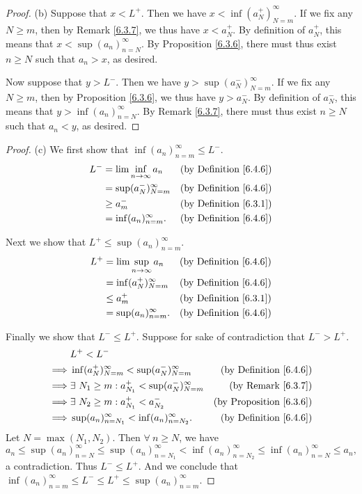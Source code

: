 \begin{proof}{(b)}
Suppose that \(x < L^+\).
Then we have \(x < \inf(a_N^+)_{N = m}^\infty\).
If we fix any \(N \geq m\), then by Remark \ref{6.3.7}, we thus have \(x < a_N^+\).
By definition of \(a_N^+\), this means that \(x < \sup(a_n)_{n = N}^\infty\).
By Proposition \ref{6.3.6}, there must thus exist \(n \geq N\) such that \(a_n > x\), as desired.

Now suppose that \(y > L^-\).
Then we have \(y > \sup(a_N^-)_{N = m}^\infty\).
If we fix any \(N \geq m\), then by Proposition \ref{6.3.6}, we thus have \(y > a_N^-\).
By definition of \(a_N^-\), this means that \(y > \inf(a_n)_{n = N}^\infty\).
By Remark \ref{6.3.7}, there must thus exist \(n \geq N\) such that \(a_n < y\), as desired.
\end{proof}

\begin{proof}{(c)}
We first show that \(\inf(a_n)_{n = m}^\infty \leq L^-\).
\begin{align*}
L^- &= \lim\inf_{n \to \infty} a_n & \text{(by Definition \ref{6.4.6})} \\
&= \sup(a_N^-)_{N = m}^\infty & \text{(by Definition \ref{6.4.6})} \\
&\geq a_m^- & \text{(by Definition \ref{6.3.1})} \\
&= \inf(a_n)_{n = m}^\infty. & \text{(by Definition \ref{6.4.6})}
\end{align*}

Next we show that \(L^+ \leq \sup(a_n)_{n = m}^\infty\).
\begin{align*}
L^+ &= \lim\sup_{n \to \infty} a_n & \text{(by Definition \ref{6.4.6})} \\
&= \inf(a_N^+)_{N = m}^\infty & \text{(by Definition \ref{6.4.6})} \\
&\leq a_m^+ & \text{(by Definition \ref{6.3.1})} \\
&= \sup(a_n)_{n = m}^\infty. & \text{(by Definition \ref{6.4.6})}
\end{align*}

Finally we show that \(L^- \leq L^+\).
Suppose for sake of contradiction that \(L^- > L^+\).
\begin{align*}
& L^+ < L^- \\
\implies & \inf(a_N^+)_{N = m}^\infty < \sup(a_N^-)_{N = m}^\infty & \text{(by Definition \ref{6.4.6})} \\
\implies & \exists\ N_1 \geq m : a_{N_1}^+ < \sup(a_N^-)_{N = m}^\infty & \text{(by Remark \ref{6.3.7})} \\
\implies & \exists\ N_2 \geq m : a_{N_1}^+ < a_{N_2}^- & \text{(by Proposition \ref{6.3.6})} \\
\implies & \sup(a_n)_{n = N_1}^\infty < \inf(a_n)_{n = N_2}^\infty. & \text{(by Definition \ref{6.4.6})}
\end{align*}
Let \(N = \max(N_1, N_2)\).
Then \(\forall\ n \geq N\), we have
\[
    a_n \leq \sup(a_n)_{n = N}^\infty \leq \sup(a_n)_{n = N_1}^\infty < \inf(a_n)_{n = N_2}^\infty \leq \inf(a_n)_{n = N}^\infty \leq a_n,
\]
a contradiction.
Thus \(L^- \leq L^+\).
And we conclude that \(\inf(a_n)_{n = m}^\infty \leq L^- \leq L^+ \leq \sup(a_n)_{n = m}^\infty\).
\end{proof}


